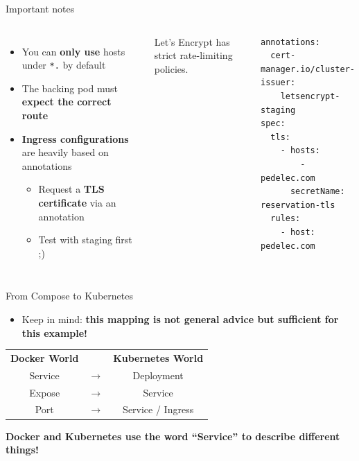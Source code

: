 \begin{frame}[fragile]{Important notes}
  \begin{columns}[T]
      \begin{itemize}
        \item You can \textbf{only use} hosts under \texttt{*.\wsIngressBase} by default
        \item The backing pod must \textbf{expect the correct route}
        \item \textbf{Ingress configurations} are heavily based on annotations
          \begin{itemize}
            \item Request a \textbf{TLS certificate} via an annotation
            \item Test with staging first ;)
          \end{itemize}
      \end{itemize}
      \smallskip Let's Encrypt has strict rate-limiting policies.
      \begin{yamlbox}
\begin{lstlisting}[style=wsyamlstyle, basicstyle=\ttfamily\scriptsize]
annotations:
  cert-manager.io/cluster-issuer:
    letsencrypt-staging
spec:
  tls:
    - hosts:
        - pedelec.com
      secretName: reservation-tls
  rules:
    - host: pedelec.com
\end{lstlisting}
      \end{yamlbox}
  \end{columns}
\end{frame}

\begin{frame}{From Compose to Kubernetes}
  \begin{itemize}
    \item Keep in mind: \textbf{this mapping is not general advice but sufficient for this example!}
  \end{itemize}
  \vfill\centering
  \begin{tabular}{c c c}
    \textbf{Docker World} & & \textbf{Kubernetes World}\\[2pt]
    Service & $\rightarrow$ & Deployment\\
    Expose  & $\rightarrow$ & Service\\
    Port    & $\rightarrow$ & Service / Ingress\\
  \end{tabular}
  \vfill
  \begin{center}\colorbox{wsnavy}{\color{white}\bfseries\small Docker and Kubernetes use the word ``Service'' to describe different things!}\end{center}
\end{frame}
